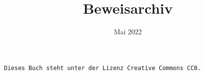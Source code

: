 \documentclass[a4paper,10pt,fleqn,twoside]{scrbook}
\title{Beweisarchiv}
\date{Mai 2022}
\numberwithin{equation}{chapter}
\theoremstyle{rmbox}
\begin{document}
\setlength{\baselineskip}{13pt}

\maketitle

\texttt{Dieses Buch steht unter der Lizenz Creative Commons CC0.}

\tableofcontents










\setlength{\baselineskip}{12pt}
\printindex
\end{document}
